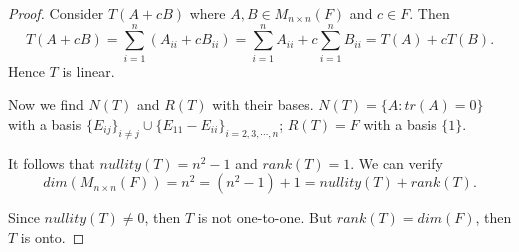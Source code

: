 \begin{Exercise}
\begin{proof}
Consider $T(A+c B)$ where $A,B\in M_{n\times n}(F)$ and $c\in F$.
Then
$$
T(A+c B) = \sum_{i=1}^{n} \left( A_{i i}+c B_{i i} \right)
= \sum_{i=1}^{n} A_{i i} + c\sum_{i=1}^{n} B_{i i}
= T(A) + c T(B).
$$
Hence $T$ is linear.

Now we find $N(T)$ and $R(T)$ with their bases. $N(T) = \{ A:tr(A) = 0\}$ with a basis $\{E_{i j}\}_{i\neq j}\cup \{E_{1 1} - E_{i i} \}_{i=2,3,\cdots,n}$;
$R(T) = F$ with a basis $\{1\}$.

It follows that $nullity(T) = n^2-1$ and $rank(T) = 1$. We can verify
$$
dim(M_{n\times n}(F)) = n^2 = (n^2-1) + 1 =  nullity(T)+rank(T).
$$

Since $nullity(T)\neq 0$, then $T$ is not one-to-one. But $rank(T) = dim(F)$, then $T$ is onto.
\end{proof}
\end{Exercise}
